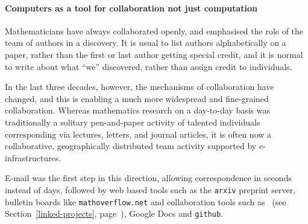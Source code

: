 %
%

\paragraph{Computers as a tool for collaboration not just computation}

Mathematicians have always collaborated openly, and emphasised the
role of the team of authors in a discovery. It is usual to list
authors alphabetically on a paper, rather than the first or last
author getting special credit, and it is normal to write about what
``we'' discovered, rather than assign credit to individuals.

In the last three decades, however, the mechanisms of collaboration
have changed, and this is enabling a much more widespread and
fine-grained collaboration. Whereas mathematics research on a
day-to-day basis was traditionally a solitary pen-and-paper activity of
talented individuals corresponding via lectures, letters, and journal
articles, it is often now a collaborative, geographically distributed
team activity supported by e-infrastructures.

E-mail was the first step in this direction, allowing correspondence in
seconds instead of days, followed by web based tools such as the
\texttt{arxiv} preprint server, bulletin boards like
\texttt{mathoverflow.net} and collaboration tools such as \SMC\ 
(see Section~\ref{linked-projects},  page~\pageref{sec:SMC-page}), Google
Docs and \texttt{github}.




